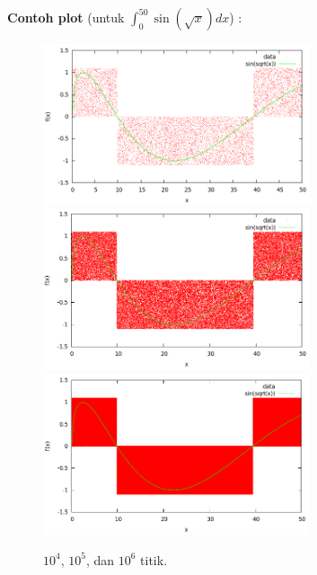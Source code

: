 \documentclass[paper=a4, fontsize=11pt]{scrartcl}
\numberwithin{equation}{section} %
\numberwithin{figure}{section} %
\numberwithin{table}{section} %
\begin{document}
\newpage
\textbf{Contoh plot} (untuk $\int_{0}^{50} \sin(\sqrt x) dx$) :\\
\begin{figure}
	\centering
	\includegraphics[width=0.7\textwidth]{f2-10rb.png}
	\includegraphics[width=0.7\textwidth]{f2-100rb.png}
	\includegraphics[width=0.7\textwidth]{f2-1jt.png}
	\caption{$10^{4}$, $10^{5}$, dan $10^{6}$ titik.}
\end{figure}
\end{document}
